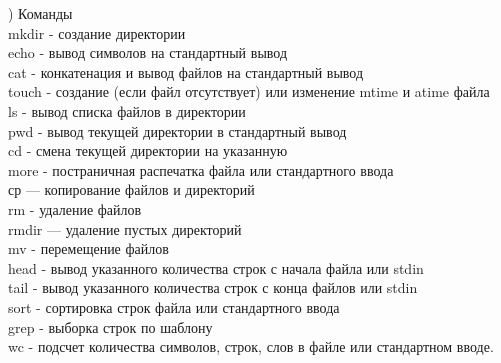) Команды \\
mkdir - создание директории \\
echo - вывод символов на стандартный вывод \\
cat - конкатенация и вывод файлов на стандартный вывод \\
touch - создание (если файл отсутствует) или изменение mtime и atime файла \\
ls -  вывод списка файлов в директории \\
pwd - вывод текущей директории в стандартный вывод \\
cd - смена текущей директории на указанную \\
more - постраничная распечатка файла или стандартного ввода \\
ср — копирование файлов и директорий \\
rm - удаление файлов \\
rmdir — удаление пустых директорий \\
mv - перемещение файлов \\
head - вывод указанного количества строк с начала файла или stdin \\
tail - вывод указанного количества строк с конца файлов или stdin \\
sort - сортировка строк файла или стандартного ввода \\
grep - выборка строк по шаблону \\
wc - подсчет количества символов, строк, слов в файле или стандартном вводе. \\

